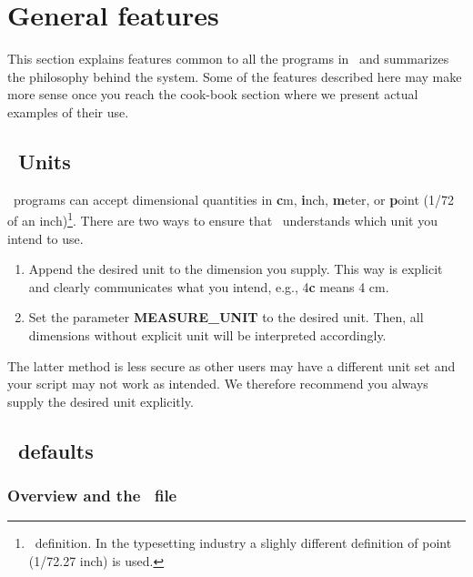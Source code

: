 %
%
\chapter{General features}
\label{ch:4}
\thispagestyle{headings}

This section explains features common to all the programs
in \GMT\ and summarizes the philosophy behind the system.  Some
of the features described here may make more sense once you reach
the cook-book section where we present actual examples of their use. 

\section{\gmt\ Units}

\GMT\ programs can accept dimensional quantities in \textbf{c}m, \textbf{i}nch,
\textbf{m}eter, or \textbf{p}oint (1/72 of an inch)\footnote{\PS\ definition.
In the typesetting industry a slighly different definition of point
(1/72.27 inch) is used.}.  There are two ways to ensure that \GMT\ understands
which unit you intend to use.

\begin{enumerate}
\item Append the desired unit to the dimension you supply.  This
way is explicit and clearly communicates what you intend, e.g.,
4\textbf{c} means 4 cm.

\item Set the parameter \textbf{MEASURE\_UNIT} to the desired unit.  Then, all
dimensions without explicit unit will be interpreted accordingly.

\end{enumerate}

The latter method is less secure as other users may have a different unit
set and your script may not work as intended.  We therefore recommend
you always supply the desired unit explicitly.

\section{\gmt\ defaults}
\subsection{Overview and the \ file}


